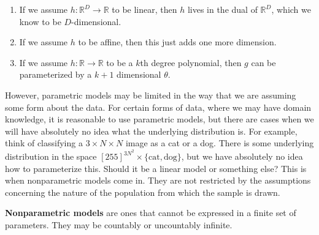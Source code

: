   \begin{example}
    \begin{enumerate}
      \item If we assume $h: \mathbb{R}^D \rightarrow \mathbb{R}$ to be linear, then $h$ lives in the dual of $\mathbb{R}^D$, which we know to be $D$-dimensional. 
      \item If we assume $h$ to be affine, then this just adds one more dimension. 
      \item If we assume $h: \mathbb{R} \rightarrow \mathbb{R}$ to be a $k$th degree polynomial, then $g$ can be parameterized by a $k+1$ dimensional $\theta$. 
    \end{enumerate}
  \end{example}

  However, parametric models may be limited in the way that we are assuming some form about the data. For certain forms of data, where we may have domain knowledge, it is reasonable to use parametric models, but there are cases when we will have absolutely no idea what the underlying distribution is. For example, think of classifying a $3 \times N \times N$ image as a cat or a dog. There is some underlying distribution in the space $[255]^{3 N^2} \times \{\text{cat}, \text{dog}\}$, but we have absolutely no idea how to parameterize this. Should it be a linear model or something else? This is when nonparametric models come in. They are not restricted by the assumptions concerning the nature of the population from which the sample is drawn. 

  \begin{definition}
    \textbf{Nonparametric models} are ones that cannot be expressed in a finite set of parameters. They may be countably or uncountably infinite. 
  \end{definition}

